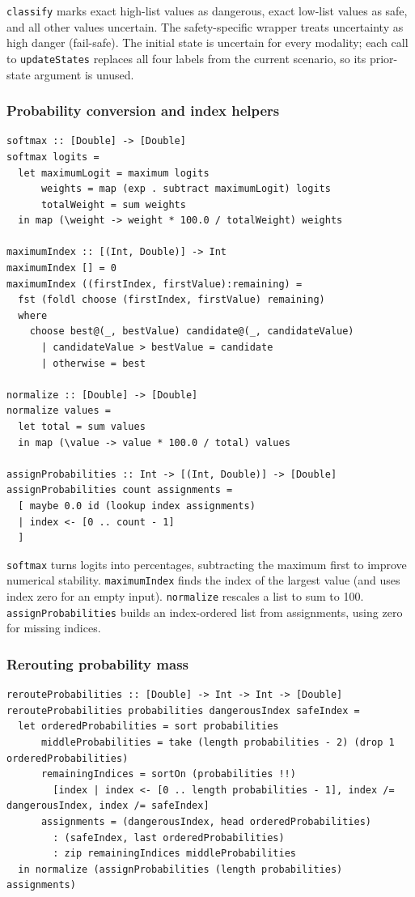 \documentclass[11pt]{article}
\begin{document}
\texttt{classify} marks exact high-list values as dangerous, exact low-list
values as safe, and all other values uncertain. The safety-specific wrapper
treats uncertainty as high danger (fail-safe). The initial state is uncertain
for every modality; each call to \texttt{updateStates} replaces all four
labels from the current scenario, so its prior-state argument is unused.

\subsubsection{Probability conversion and index helpers}

\begin{lstlisting}
softmax :: [Double] -> [Double]
softmax logits =
  let maximumLogit = maximum logits
      weights = map (exp . subtract maximumLogit) logits
      totalWeight = sum weights
  in map (\weight -> weight * 100.0 / totalWeight) weights

maximumIndex :: [(Int, Double)] -> Int
maximumIndex [] = 0
maximumIndex ((firstIndex, firstValue):remaining) =
  fst (foldl choose (firstIndex, firstValue) remaining)
  where
    choose best@(_, bestValue) candidate@(_, candidateValue)
      | candidateValue > bestValue = candidate
      | otherwise = best

normalize :: [Double] -> [Double]
normalize values =
  let total = sum values
  in map (\value -> value * 100.0 / total) values

assignProbabilities :: Int -> [(Int, Double)] -> [Double]
assignProbabilities count assignments =
  [ maybe 0.0 id (lookup index assignments)
  | index <- [0 .. count - 1]
  ]
\end{lstlisting}

\texttt{softmax} turns logits into percentages, subtracting the maximum first
to improve numerical stability. \texttt{maximumIndex} finds the index of the
largest value (and uses index zero for an empty input). \texttt{normalize}
rescales a list to sum to 100. \texttt{assignProbabilities} builds an
index-ordered list from assignments, using zero for missing indices.

\subsubsection{Rerouting probability mass}

\begin{lstlisting}
rerouteProbabilities :: [Double] -> Int -> Int -> [Double]
rerouteProbabilities probabilities dangerousIndex safeIndex =
  let orderedProbabilities = sort probabilities
      middleProbabilities = take (length probabilities - 2) (drop 1 orderedProbabilities)
      remainingIndices = sortOn (probabilities !!)
        [index | index <- [0 .. length probabilities - 1], index /= dangerousIndex, index /= safeIndex]
      assignments = (dangerousIndex, head orderedProbabilities)
        : (safeIndex, last orderedProbabilities)
        : zip remainingIndices middleProbabilities
  in normalize (assignProbabilities (length probabilities) assignments)
\end{lstlisting}
\end{document}

